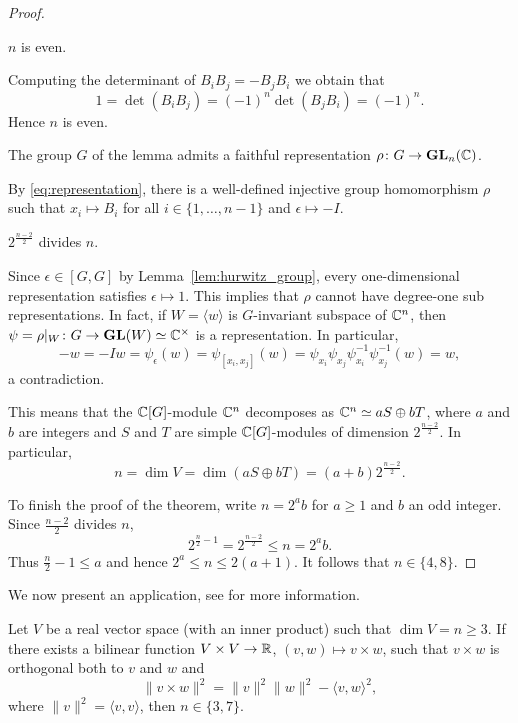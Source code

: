 \begin{proof}
    \begin{claim}
        $n$ is even. 
    \end{claim}
    
	Computing the determinant of 
	$B_iB_j=-B_jB_i$ we obtain that 
	\[
	1=\det(B_iB_j)=(-1)^n\det(B_jB_i)=(-1)^n.
	\]
	Hence $n$ is even. 

	\begin{claim}
	    The group 
	    $G$ of the lemma admits a faithful
	    representation $\rho\colon G\to\mathbf{GL}_n(\mathbb{C})$. 
	\end{claim}
	
	By \eqref{eq:representation}, there is a well-defined 
	injective group homomorphism $\rho$ such that 
	$x_i\mapsto B_i$ for all $i\in\{1,\dots,n-1\}$ and 
	$\epsilon\mapsto -I$. 
	
	\begin{claim}
	    $2^{\frac{n-2}{2}}$ divides $n$.
	\end{claim}
	
	Since $\epsilon\in[G,G]$ by Lemma~\ref{lem:hurwitz_group}, 
	every one-dimensional representation satisfies $\epsilon\mapsto 1$.
	This implies that $\rho$ cannot have degree-one sub representations. 
	In fact, 
	if $W=\langle w\rangle$ is $G$-invariant subspace of $\mathbb{C}^n$, 
	then $\psi=\rho|_W\colon G\to\mathbf{GL}(W)\simeq\mathbb{C}^\times$ 
	is a representation. In particular, 
	\[
	-w=-Iw=\psi_{\epsilon}(w)=\psi_{[x_i,x_j]}(w)
	=\psi_{x_i}\psi_{x_j}\psi_{{x_i}}^{-1}\psi_{{x_j}}^{-1}(w)=w, 
	\]
	a contradiction. 
	
	This means that the $\mathbb{C}[G]$-module $\mathbb{C}^n$ 
	decomposes as $\mathbb{C}^n\simeq aS\oplus bT$,
	where $a$ and $b$ are integers and 
	$S$ and $T$ are simple $\mathbb{C}[G]$-modules of dimension
	$2^{\frac{n-2}{2}}$. In particular, 
	\[
	n=\dim V=\dim(aS\oplus bT)=(a+b)2^{\frac{n-2}{2}}.
	\]
	
	To finish the proof of the theorem, write $n=2^ab$ 
	for $a\geq1$ and $b$ an odd integer. 
	Since $\frac{n-2}{2}$ divides $n$, 
	\[
	2^{\frac{n}{2}-1}=2^{\frac{n-2}{2}}\leq n=2^ab. 
	\]
	Thus $\frac{n}{2}-1\leq a$ and hence $2^a\leq n\leq 2(a+1)$. 
	It follows that $n\in\{4,8\}$.  
\end{proof}

We now present an application, see
\cite{MR1534187} for more information. 

\begin{theorem}
	Let $V$ be a real vector space (with an inner product) 
	such that $\dim
	V=n\geq3$. If there exists a bilinear function 
	$V\times V\to\mathbb{R}$, $(v,w)\mapsto v\times
	w$, such that $v\times w$ is orthogonal both 
	to $v$ and $w$ and 
	\[
		\|v\times w\|^2=\|v\|^2\|w\|^2-\langle v,w\rangle^2,
	\]
	where $\|v\|^2=\langle v,v\rangle$, then $n\in\{3,7\}$. 
\end{theorem}

